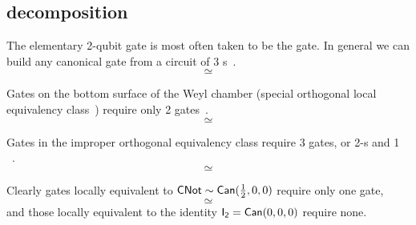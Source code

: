 \subsection{ decomposition}
\label{sec:cnotdeke}
The elementary 2-qubit gate is most often taken to be the  gate. In general we can build any canonical gate from a circuit of 3 s~\cite{Vidal2004a, Vatan2004a}.
$$

\simeq

$$

Gates on the bottom surface of the Weyl chamber (special orthogonal local equivalency class~) require only 2  gates~\cite{Vidal2004a,Vatan2004a}.
$$

\simeq

$$

Gates in the improper orthogonal equivalency class  require 3  gates, or 2-s and 1 ~\cite{Vatan2004a}.
$$

\simeq

$$

Clearly gates locally equivalent to $\Gate{CNot}\loceq\Gate{Can}(\half, 0,0)$ require only one  gate, 
$$

\simeq

$$
and those locally equivalent to the identity $\Gate{I_2}=\Gate{Can}(0, 0,0)$ require none. 

